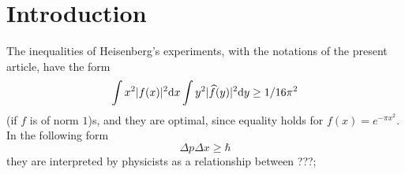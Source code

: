 \section*{Introduction}


The inequalities of Heisenberg's experiments, with the notations of the present article, have the form
\[
    \int x^2 |f(x)|^2 \mathrm{d} x \int y^2 |\widehat{f}(y)|^2 \mathrm{d} y \geq 1 / 16 \pi^2
\]
(if $f$ is of norm $1$)s, and they are optimal, since equality holds for $f(x) = e^{-\pi x^2}$.
In the following form
\[
    \Delta p \Delta x \geq \hbar
\]
they are interpreted by physicists as a relationship between ???;